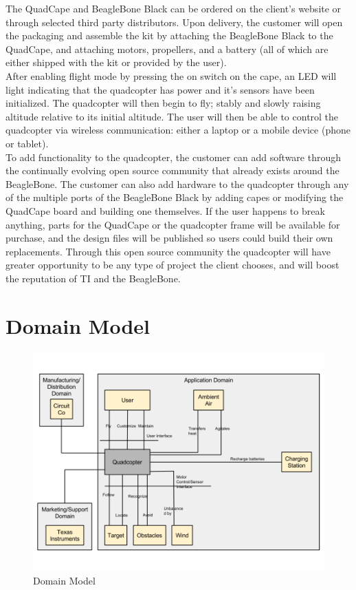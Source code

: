 \documentclass[a4paper,10pt]{scrartcl}
\begin{document}
\noindent The QuadCape and BeagleBone Black can be ordered on the client’s
website or through selected third party distributors. Upon delivery, the
customer will open the packaging and assemble the kit by attaching the
BeagleBone Black to the QuadCape, and attaching motors, propellers, and a
battery (all of which are either shipped with the kit or provided by the
user). \\

\noindent After enabling flight mode by pressing the on switch on the cape, an
LED will light indicating that the quadcopter has power and it's sensors have
been initialized. The quadcopter will then begin to fly; stably and slowly
raising altitude relative to its initial altitude. The user will then be able to
control the quadcopter via wireless communication: either a laptop or a mobile
device (phone or tablet). \\

\noindent To add functionality to the quadcopter, the customer can add software
through the continually evolving open source community that already exists
around the BeagleBone. The customer can also add hardware to the quadcopter
through any of the multiple ports of the BeagleBone Black by adding capes or
modifying the QuadCape board and building one themselves. If the user happens to
break anything, parts for the QuadCape or the quadcopter frame will be available
for purchase, and the design files will be published so users could build their
own replacements. Through this open source community the quadcopter will have
greater opportunity to be any type of project the client chooses, and will boost
the reputation of TI and the BeagleBone.

\newpage
\section{Domain Model}
\begin{figure}[h]
 \centering
 \includegraphics[scale=0.5]{./DomainModel.png}
 \caption{Domain Model}
\end{figure}
\end{document}
